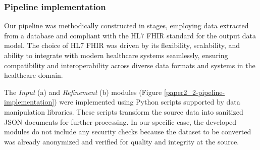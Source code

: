 \subsubsection{Pipeline implementation}
Our pipeline was methodically constructed in stages, employing data extracted from a database and compliant with the HL7 FHIR standard for the output data model. The choice of HL7 FHIR was driven by its flexibility, scalability, and ability to integrate with modern healthcare systems seamlessly, ensuring compatibility and interoperability across diverse data formats and systems in the healthcare domain.

The \textit{Input} (a) and \textit{Refinement} (b) modules (Figure \ref{paper2_2-pipeline-implementation}) were implemented using Python scripts supported by data manipulation libraries. These scripts transform the source data into sanitized JSON documents for further processing. In our specific case, the developed modules do not include any security checks because the dataset to be converted was already anonymized and verified for quality and integrity at the source.

